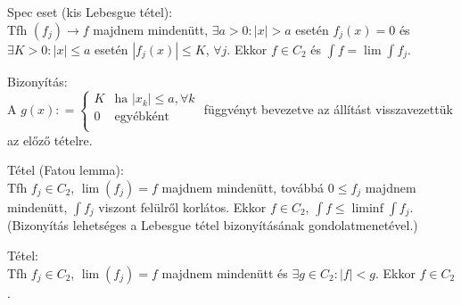 \documentclass[12pt,a4paper]{scrartcl}
\newenvironment{tetel}{}{}
\newenvironment{bizonyitas}{}{}
\begin{document}
\begin{tetel}

Spec eset (kis Lebesgue tétel):\\
Tfh \(\left. \left( f_{j} \right)\rightarrow f \right.\) majdnem
mindenütt, \(\exists a > 0:\left| x \right| > a\) esetén
\(f_{j}\left( x \right) = 0\) és
\(\exists K > 0:\left| x \right| \leq a\) esetén
\(\left| {f_{j}\left( x \right)} \right| \leq K\), \(\forall j\). Ekkor
\(f \in C_{2}\) és \({\int f} = \lim{\int f_{j}}\).

\end{tetel}

\begin{bizonyitas}

Bizonyítás:\\
A
\(g\left( x \right): = \left\{ \begin{matrix} K & {\text{ha~}\left| x_{k} \right| \leq a,\forall k} \\ 0 & \text{egyébként} \\ \end{matrix} \right.\)
függvényt bevezetve az állítást visszavezettük az előző tételre.

\end{bizonyitas}

\begin{tetel}

Tétel (Fatou lemma):\\
Tfh \(f_{j} \in C_{2}\), \(\lim\left( f_{j} \right) = f\) majdnem
mindenütt, továbbá \(0 \leq f_{j}\) majdnem mindenütt, \(\int f_{j}\)
viszont felülről korlátos. Ekkor \(f \in C_{2}\),
\({\int f} \leq \liminf{\int f_{j}}\). (Bizonyítás lehetséges a Lebesgue
tétel bizonyításának gondolatmenetével.)

\end{tetel}

\begin{tetel}

Tétel:\\
Tfh \(f_{j} \in C_{2}\), \(\lim\left( f_{j} \right) = f\) majdnem
mindenütt és \(\exists g \in C_{2}:\left| f \right| < g\). Ekkor
\(f \in C_{2}\).

\end{tetel}
\end{document}
